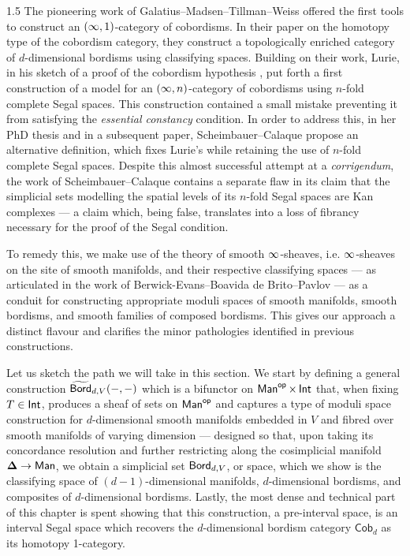\documentclass{amsbook}
\begin{document}
\begin{spacing}{1.5}
The pioneering work of Galatius--Madsen--Tillman--Weiss offered the first tools to construct an $(\operatorname{\infty},1)$-category of cobordisms. In their paper on the homotopy type of the cobordism category, they construct a topologically enriched category of $d$-dimensional bordisms using classifying spaces. Building on their work, Lurie, in his sketch of a proof of the cobordism hypothesis \cite{Lur09}, put forth a first construction of a model for an $(\operatorname{\infty},n)$-category of cobordisms using $n$-fold complete Segal spaces. This construction contained a small mistake preventing it from satisfying the \emph{essential constancy} condition. In order to address this, in her PhD thesis and in a subsequent paper, Scheimbauer--Calaque propose an alternative definition, which fixes Lurie’s while retaining the use of $n$-fold complete Segal spaces. Despite this almost successful attempt at a \emph{corrigendum}, the work of Scheimbauer--Calaque contains a separate flaw in its claim that the simplicial sets modelling the spatial levels of its $n$-fold Segal spaces are Kan complexes — a claim which, being false, translates into a loss of fibrancy necessary for the proof of the Segal condition.

To remedy this, we make use of the theory of smooth $\operatorname{\infty}$-sheaves, i.e. $\operatorname{\infty}$-sheaves on the site of smooth manifolds, and their respective classifying spaces — as articulated in the work of Berwick-Evans--Boavida de Brito--Pavlov \cite{BBEP24} — as a conduit for constructing appropriate moduli spaces of smooth manifolds, smooth bordisms, and smooth families of composed bordisms. This gives our approach a distinct flavour and clarifies the minor pathologies identified in previous constructions.

Let us sketch the path we will take in this section. We start by defining a general construction $\widetilde{\operatorname{\mathsf{Bord}}}_{d,V}(-,-)$ which is a bifunctor on $\operatorname{\sf Man}^{\mathsf{op}}\times \operatorname{\mathsf{Int}}$ that, when fixing $T\in \operatorname{\mathsf{Int}}$, produces a sheaf of sets on $\operatorname{\sf Man}^{\mathsf{op}}$ and captures a type of moduli space construction for $d$-dimensional smooth manifolds embedded in $V$ and fibred over smooth manifolds of varying dimension — designed so that, upon taking its concordance resolution and further restricting along the cosimplicial manifold $\mathbf\Delta \rightarrow \operatorname{\sf Man}$, we obtain a simplicial set $\operatorname{\mathsf{Bord}}_{d,V}$, or space, which we show is the classifying space of $(d-1)$-dimensional manifolds, $d$-dimensional bordisms, and composites of $d$-dimensional bordisms. Lastly, the most dense and technical part of this chapter is spent showing that this construction, a pre-interval space, is an interval Segal space which recovers the $d$-dimensional bordism category $\mathsf{Cob}_d$ as its homotopy 1-category.


\end{spacing}
\end{document}
